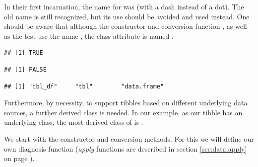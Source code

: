 \documentclass[krantz2]{krantz}\usepackage{knitr}
\begin{document}
\begin{infobox}
In their first incarnation, the name for  was  (with a dash instead of a dot). The old name is still recognized, but its use should be avoided and  used instead. One should be aware that although the constructor  and conversion function , as well as the test  use the name , the class attribute is named .

\begin{knitrout}\footnotesize
{}\color{fgcolor}\begin{kframe}
\begin{alltt}
 \hlkwb{<-} \hlstd{(} \hlstd{=} \hlopt{:}\hlstd{)}
\end{alltt}
\begin{verbatim}
## [1] TRUE
\end{verbatim}
\begin{alltt}
 \hlstd{)}
\end{alltt}
\begin{verbatim}
## [1] FALSE
\end{verbatim}
\begin{alltt}
\end{alltt}
\begin{verbatim}
## [1] "tbl_df"     "tbl"        "data.frame"
\end{verbatim}
\end{kframe}
\end{knitrout}

Furthermore, by necessity, to support tibbles based on different underlying data sources, a further derived class is needed. In our example, as our tibble has an underlying  class, the most derived class of  is .
\end{infobox}

We start with the constructor and conversion methods. For this we will define our own diagnosis function (\emph{apply} functions are described in section \ref{sec:data:apply} on page \pageref{sec:data:apply}).
\end{document}
